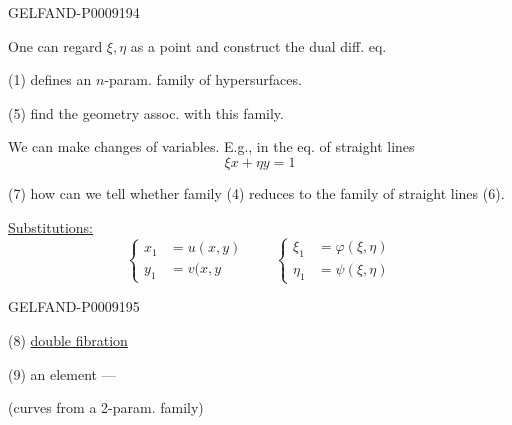 \begin{GelfandAdjacentEvidence}{GELFAND-P000919}{4}


One can regard $\xi,\eta$ as a point and construct the dual diff. eq.

(1) defines an $n$-param. family of hypersurfaces.

(5)  find the geometry assoc. with this family.

We can make changes of variables. E.g., in the eq. of straight lines
\begin{equation*}
 \xi x+\eta y=1
 \tag{6}
\end{equation*}

(7)  how can we tell whether family (4) reduces to the family of straight lines (6).

\uline{Substitutions:}
\begin{equation*}
 \left\{\begin{aligned}
 x_1&=u(x,y)\\
 y_1&=v(x,y
 \end{aligned}\right.
 \qquad
 \left\{\begin{aligned}
 \xi_1&=\varphi(\xi,\eta)\\
 \eta_1&=\psi(\xi,\eta)
 \end{aligned}\right.
\end{equation*}
\end{GelfandAdjacentEvidence}
\begin{GelfandAdjacentEvidence}{GELFAND-P000919}{5}


(8)  \uline{double fibration}

(9) an element --- 

(curves from a 2-param. family)

\end{GelfandAdjacentEvidence}


